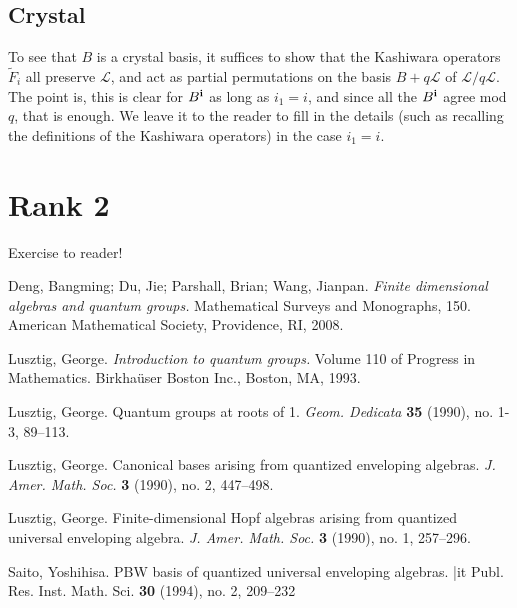 \documentclass[11pt]{amsart}
\numberwithin{equation}{section}
\theoremstyle{definition}
\renewcommand{\tilde}{\widetilde}
\begin{document}
\subsection{Crystal}
To see that $B$ is a crystal basis, it suffices to show that the Kashiwara operators $\tilde F_i$ all preserve $\mathcal{L}$, and act as partial permutations on the basis $B + q \mathcal{L}$ of $\mathcal{L}/q\mathcal{L}$. The point is, this is clear for $B^{\bf i}$ as long as $i_1=i$, and since all the $B^{\bf i}$ agree mod $q$, that is enough. We leave it to the reader to fill in the details (such as recalling the definitions of the Kashiwara operators) in the case $i_1=i$. 


\section{Rank 2} \label{sec:sl3}

Exercise to reader!

\begin{thebibliography}{99}

 Deng, Bangming; Du, Jie; Parshall, Brian; Wang, Jianpan. {\it Finite dimensional algebras and quantum groups.} Mathematical Surveys and Monographs, 150. American Mathematical Society, Providence, RI, 2008.

Lusztig, George. {\it Introduction to quantum groups.} Volume 110 of Progress in Mathematics. Birkha\"user Boston
Inc., Boston, MA, 1993.

 Lusztig, George. Quantum groups at roots of 1. {\it Geom. Dedicata} {\bf 35} (1990), no. 1-3, 89--113. 

 Lusztig, George. Canonical bases arising from quantized enveloping algebras. {\it J. Amer. Math. Soc.} {\bf 3} (1990), no. 2, 447--498. 

 Lusztig, George. Finite-dimensional Hopf algebras arising from quantized universal enveloping algebra. {\it J. Amer. Math. Soc.} {\bf 3} (1990), no. 1, 257--296.

 Saito, Yoshihisa. PBW basis of quantized universal enveloping algebras. {|it Publ. Res. Inst. Math. Sci.} {\bf 30} (1994), no. 2, 209--232



\end{thebibliography}
\end{document}
